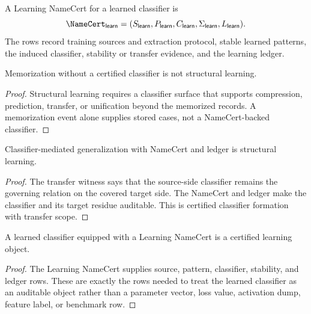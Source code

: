 \begin{definition}
\label{def:philosophy-learning-namecert}
A Learning NameCert for a learned classifier is
$$
\NameCert_{\mathsf{learn}}
=
(S_{\mathsf{learn}},
P_{\mathsf{learn}},
C_{\mathsf{learn}},
\Sigma_{\mathsf{learn}},
L_{\mathsf{learn}}).
$$
The rows record training sources and extraction protocol, stable learned
patterns, the induced classifier, stability or transfer evidence, and
the learning ledger.
\end{definition}

\begin{theorem}
\label{thm:philosophy-memorization-not-structural-learning}
Memorization without a certified classifier is not structural learning.
\end{theorem}
\begin{proof}
Structural learning requires a classifier surface that supports
compression, prediction, transfer, or unification beyond the memorized
records. A memorization event alone supplies stored cases, not a
NameCert-backed classifier.
\end{proof}

\begin{theorem}
\label{thm:philosophy-certified-generalization-structural-learning}
Classifier-mediated generalization with NameCert and ledger is
structural learning.
\end{theorem}
\begin{proof}
The transfer witness says that the source-side classifier remains the
governing relation on the covered target side. The NameCert and ledger
make the classifier and its target residue auditable. This is certified
classifier formation with transfer scope.
\end{proof}

\begin{theorem}
\label{thm:philosophy-learning-namecert-certified-object}
A learned classifier equipped with a Learning NameCert is a certified
learning object.
\end{theorem}
\begin{proof}
The Learning NameCert supplies source, pattern, classifier, stability,
and ledger rows. These are exactly the rows needed to treat the learned
classifier as an auditable object rather than a parameter vector, loss
value, activation dump, feature label, or benchmark row.
\end{proof}

